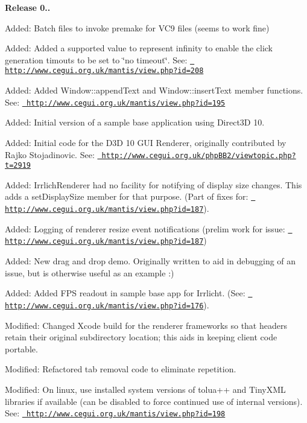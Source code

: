 {\bfseries{Release 0..}}
\begin{DoxyItemize}
\item Added\+: Batch files to invoke premake for V\+C9 files (seems to work fine)
\item Added\+: Added a supported value to represent infinity to enable the click generation timouts to be set to \char`\"{}no timeout\char`\"{}. See\+: \href{http://www.cegui.org.uk/mantis/view.php?id=208}{\texttt{ http\+://www.\+cegui.\+org.\+uk/mantis/view.\+php?id=208}}
\item Added\+: Added Window\+::append\+Text and Window\+::insert\+Text member functions. See\+: \href{http://www.cegui.org.uk/mantis/view.php?id=195}{\texttt{ http\+://www.\+cegui.\+org.\+uk/mantis/view.\+php?id=195}}
\item Added\+: Initial version of a sample base application using Direct3D 10.
\item Added\+: Initial code for the D3D 10 G\+UI Renderer, originally contributed by Rajko Stojadinovic. See\+: \href{http://www.cegui.org.uk/phpBB2/viewtopic.php?t=2919}{\texttt{ http\+://www.\+cegui.\+org.\+uk/php\+B\+B2/viewtopic.\+php?t=2919}}
\item Added\+: Irrlich\+Renderer had no facility for notifying of display size changes. This adds a set\+Display\+Size member for that purpose. (Part of fixes for\+: \href{http://www.cegui.org.uk/mantis/view.php?id=187}{\texttt{ http\+://www.\+cegui.\+org.\+uk/mantis/view.\+php?id=187}}).
\item Added\+: Logging of renderer resize event notifications (prelim work for issue\+: \href{http://www.cegui.org.uk/mantis/view.php?id=187}{\texttt{ http\+://www.\+cegui.\+org.\+uk/mantis/view.\+php?id=187}})
\item Added\+: New drag and drop demo. Originally written to aid in debugging of an issue, but is otherwise useful as an example \+:)
\item Added\+: Added F\+PS readout in sample base app for Irrlicht. (See\+: \href{http://www.cegui.org.uk/mantis/view.php?id=176}{\texttt{ http\+://www.\+cegui.\+org.\+uk/mantis/view.\+php?id=176}}).
\item Modified\+: Changed Xcode build for the renderer frameworks so that headers retain their original subdirectory location; this aids in keeping client code portable.
\item Modified\+: Refactored tab removal code to eliminate repetition.
\item Modified\+: On linux, use installed system versions of tolua++ and Tiny\+X\+ML libraries if available (can be disabled to force continued use of internal versions). See\+: \href{http://www.cegui.org.uk/mantis/view.php?id=198}{\texttt{ http\+://www.\+cegui.\+org.\+uk/mantis/view.\+php?id=198}}

\end{DoxyItemize}
